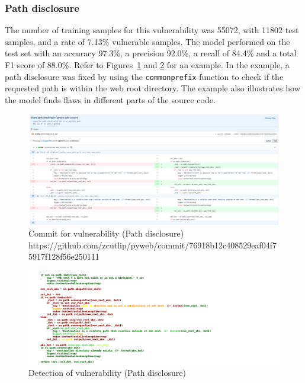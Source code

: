 \documentclass[
a4paper,
pagesize,
pdftex,
12pt,
ngerman,
fleqn,
final,
]{scrartcl}
\begin{document}
	
	\newpage
	\subsubsection{Path disclosure}
	The number of training samples for this vulnerability was 55072, with 11802 test samples, and a rate of 7.13\% vulnerable samples. The model performed on the test set with an accuracy 97.3\%, a precision 92.0\%, a recall of 84.4\% and a total F1 score of 88.0\%. Refer to Figures~\ref{fig:path_disclosureB} and \ref{fig:path_disclosureBr} for an example. In the example, a path disclosure was fixed by using the \texttt{commonprefix} function to check if the requested path is within the web root directory. The example also illustrates how the model finds flaws in different parts of the source code.
	
	\begin{figure}[H]
		\centering
		\includegraphics[width=\linewidth]{Images/path_disclosureC}
		\caption{Commit for vulnerability (Path disclosure) \newline \scriptsize{https://github.com/zcutlip/pyweb/commit/76918b12c408529eaf04f75917f128f56e250111}}
		\label{fig:path_disclosureB}
	\end{figure}
	\begin{figure}[H]
		\centering
		\includegraphics[width=\linewidth]{Images/path_disclosureCr}
		\caption{Detection of vulnerability (Path disclosure)}
		\label{fig:path_disclosureBr}
	\end{figure}
	
\end{document}
